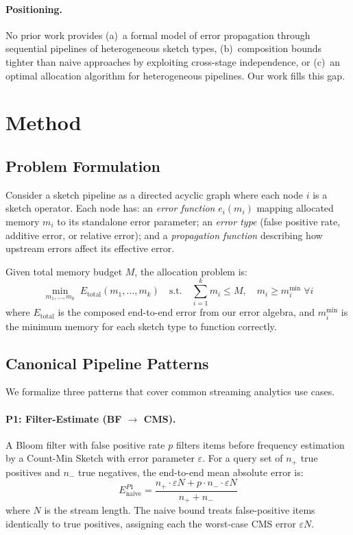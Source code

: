 \documentclass[preprint]{article}
\begin{document}
\paragraph{Positioning.}
No prior work provides (a)~a formal model of error propagation through sequential pipelines of heterogeneous sketch types, (b)~composition bounds tighter than naive approaches by exploiting cross-stage independence, or (c)~an optimal allocation algorithm for heterogeneous pipelines. Our work fills this gap.

\section{Method}
\label{sec:method}

\subsection{Problem Formulation}

Consider a sketch pipeline as a directed acyclic graph where each node $i$ is a sketch operator. Each node has: an \emph{error function} $e_i(m_i)$ mapping allocated memory $m_i$ to its standalone error parameter; an \emph{error type} (false positive rate, additive error, or relative error); and a \emph{propagation function} describing how upstream errors affect its effective error.

Given total memory budget $M$, the allocation problem is:
\begin{equation}
\label{eq:optimization}
\min_{m_1, \ldots, m_k} \; E_{\text{total}}(m_1, \ldots, m_k) \quad \text{s.t.} \quad \sum_{i=1}^{k} m_i \leq M, \quad m_i \geq m_i^{\min} \; \forall i
\end{equation}
where $E_{\text{total}}$ is the composed end-to-end error from our error algebra, and $m_i^{\min}$ is the minimum memory for each sketch type to function correctly.

\subsection{Canonical Pipeline Patterns}

We formalize three patterns that cover common streaming analytics use cases.

\paragraph{P1: Filter-Estimate (BF $\to$ CMS).}
A Bloom filter with false positive rate $p$ filters items before frequency estimation by a Count-Min Sketch with error parameter $\varepsilon$. For a query set of $n_+$ true positives and $n_-$ true negatives, the end-to-end mean absolute error is:
\begin{equation}
\label{eq:p1_naive}
E_{\text{naive}}^{P1} = \frac{n_+ \cdot \varepsilon N + p \cdot n_- \cdot \varepsilon N}{n_+ + n_-}
\end{equation}
where $N$ is the stream length. The naive bound treats false-positive items identically to true positives, assigning each the worst-case CMS error $\varepsilon N$.
\end{document}

